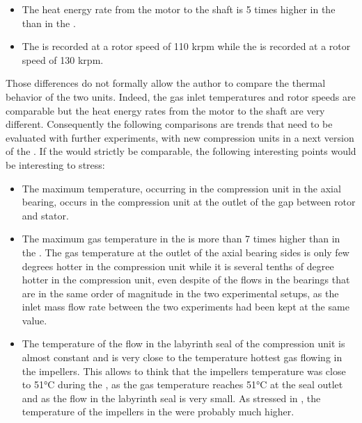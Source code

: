 \begin{itemize}
\item The heat energy rate from the motor to the shaft is 5 times
  higher in the \AWP{} \OP{} than in the \BWP{} \OP{}.
\item The \BWP{} \OP{} is recorded at a rotor speed of 110 krpm while
  the \AWP{} \OP{} is recorded at a rotor speed of 130 krpm.
\end{itemize}

Those differences do not formally allow the author to compare the
thermal behavior of the two units. Indeed, the gas inlet temperatures
and rotor speeds are comparable but the heat energy rates from the
motor to the shaft are very different. Consequently the following
comparisons are trends that need to be evaluated with further
experiments, with new compression units in a next version of the
\BWP{}. If the \OP{} would strictly be comparable, the following
interesting points would be interesting to stress:

\begin{itemize}
\item The maximum temperature, occurring in the \AWP{} compression unit
  in the axial bearing, occurs in the \BWP{} compression unit at the
  outlet of the gap between rotor and stator.
\item The maximum gas temperature in the \AWP{} is more than 7 times
  higher than in the \BWP{}. The gas temperature at the outlet of the
  axial bearing sides is only few degrees hotter in the \BWP{}
  compression unit while it is several tenths of degree hotter in the
  \AWP{} compression unit, even despite of the flows in the bearings
  that are in the same order of magnitude in the two experimental
  setups, as the inlet mass flow rate between the two experiments had
  been kept at the same value.
\item The temperature of the flow in the labyrinth seal of the \BWP{}
  compression unit is almost constant and is very close to the
  temperature hottest gas flowing in the impellers. This allows to
  think that the impellers temperature was close to
  \num{51}\si{\degreeCelsius} during the \BWP{} \OP{}, as the gas
  temperature reaches \num{51}\si{\degreeCelsius} at the seal outlet
  and as the flow in the labyrinth seal is very small. As stressed in
  , the temperature of the impellers in
  the \AWP{} were probably much higher.
\end{itemize}

